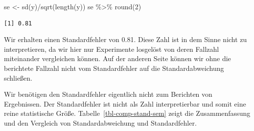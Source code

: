 \documentclass[
  letterpaper,
  DIV=11,
  oneside]{scrreport}
\newenvironment{Shaded}{\begin{snugshade}}{\end{snugshade}}
\newcommand{\DecValTok}[1]{\textcolor[rgb]{0.68,0.00,0.00}{#1}}
\newcommand{\FunctionTok}[1]{\textcolor[rgb]{0.28,0.35,0.67}{#1}}
\newcommand{\NormalTok}[1]{\textcolor[rgb]{0.00,0.23,0.31}{#1}}
\newcommand{\OtherTok}[1]{\textcolor[rgb]{0.00,0.23,0.31}{#1}}
\newcommand{\SpecialCharTok}[1]{\textcolor[rgb]{0.37,0.37,0.37}{#1}}
\begin{document}
\begin{Shaded}
\begin{Highlighting}[]
\NormalTok{se }\OtherTok{\textless{}{-}} \FunctionTok{sd}\NormalTok{(y)}\SpecialCharTok{/}\FunctionTok{sqrt}\NormalTok{(}\FunctionTok{length}\NormalTok{(y))}
\NormalTok{se }\SpecialCharTok{\%\textgreater{}\%} \FunctionTok{round}\NormalTok{(}\DecValTok{2}\NormalTok{)}
\end{Highlighting}
\end{Shaded}

\begin{verbatim}
[1] 0.81
\end{verbatim}

Wir erhalten einen Standardfehler von 0.81. Diese Zahl ist in dem Sinne
nicht zu interpretieren, da wir hier nur Experimente losgelöst von deren
Fallzahl miteinander vergleichen können. Auf der anderen Seite können
wir ohne die berichtete Fallzahl nicht vom Standardfehler auf die
Standardabweichung schließen.

{}

Wir benötigen den Standardfehler eigentlich nicht zum Berichten von
Ergebnissen. Der Standardfehler ist nicht als Zahl interpretierbar und
somit eine reine statistische Größe. Tabelle~\ref{tbl-comp-stand-sem}
zeigt die Zusammenfassung und den Vergleich von Standardabweichung und
Standardfehler.
\end{document}
